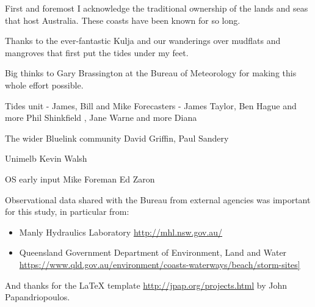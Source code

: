 
\begin{acknowledgements}

{\parindent0pt

First and foremost I acknowledge the traditional ownership of the lands and seas that host Australia. These coasts have been known for so long.
\newline{}

Thanks to the ever-fantastic Kulja and our wanderings over mudflats and mangroves that first put the tides under my feet.   
    
\newline{}    
    
Big thinks to Gary Brassington at the Bureau of Meteorology for making this whole effort possible.

\newline{}

Tides  unit - James, Bill and Mike
Forecasters - James Taylor, Ben Hague and more
Phil Shinkfield , Jane Warne and more
Diana
    
The wider Bluelink community
David Griffin, Paul Sandery    
    
Unimelb
Kevin Walsh

OS early input 
Mike Foreman
Ed Zaron

\newline{}

Observational data shared with the Bureau from external agencies was important for this study, in particular from:
\begin{itemize}
    \item Manly Hydraulics Laboratory \url{http://mhl.nsw.gov.au/}
    \item Queensland Government Department of Environment, Land and Water \url{https://www.qld.gov.au/environment/coasts-waterways/beach/storm-sites]}
\end{itemize}


And thanks for the LaTeX template \url{http://jpap.org/projects.html} by John Papandriopoulos.

}   %
\end{acknowledgements}
